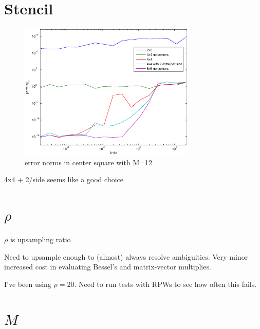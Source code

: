 \documentclass{article}
\begin{document}
\section*{Stencil}

\begin{figure}[h!]
  \begin{center}
    \includegraphics[width=0.75\textwidth]{figures/error_vs_kdx_over_stencils.eps}
    \caption{error norms in center square with M=12}
  \end{center}
\end{figure}

4x4 + 2/side seems like a good choice


\section*{$\rho$}
$\rho$ is upsampling ratio

Need to upsample enough to (almost) always resolve ambiguities. Very minor increased cost in evaluating Bessel's and matrix-vector multiplies.

I've been using $\rho=20$. Need to run tests with RPWs to see how often this fails.

\section*{$M$}
\end{document}
